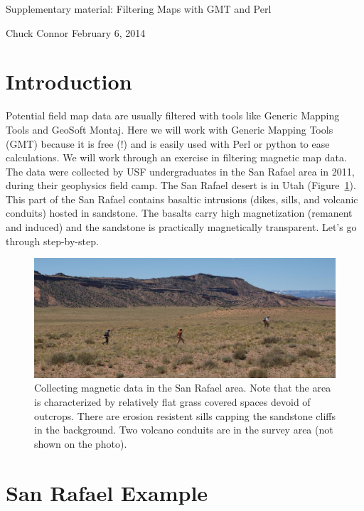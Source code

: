 \documentclass[letterpaper,10pt]{report}
\begin{document}
\begin{center}

Supplementary material: Filtering Maps with GMT and Perl

Chuck Connor
February 6, 2014
\end{center}

\section*{Introduction}
Potential field map data are usually filtered with tools like Generic Mapping Tools and GeoSoft Montaj. Here we will work with Generic Mapping Tools (GMT) because it is free (!) and is easily used with Perl or python to ease calculations. We will work through an exercise in filtering magnetic map data. The data were collected by USF undergraduates in the San Rafael area in 2011, during their geophysics field camp. The San Rafael desert is in Utah (Figure~\ref{fig:survey}). This part of the San Rafael contains basaltic intrusions (dikes, sills, and volcanic conduits) hosted in sandstone. The basalts carry high magnetization (remanent and induced) and the sandstone is practically magnetically transparent. Let's go through step-by-step.


\begin{figure}
    \centering
    \includegraphics[scale=0.3]{./images/survey2.jpg}
    \caption{
Collecting magnetic data in the San Rafael area. Note that the area is characterized by relatively flat grass covered spaces devoid of outcrops. There are erosion resistent sills capping the sandstone cliffs in the background. Two volcano conduits are in the survey area (not shown on the photo).}
    \label{fig:survey}
\end{figure}


\section*{San Rafael Example}
\end{document}
